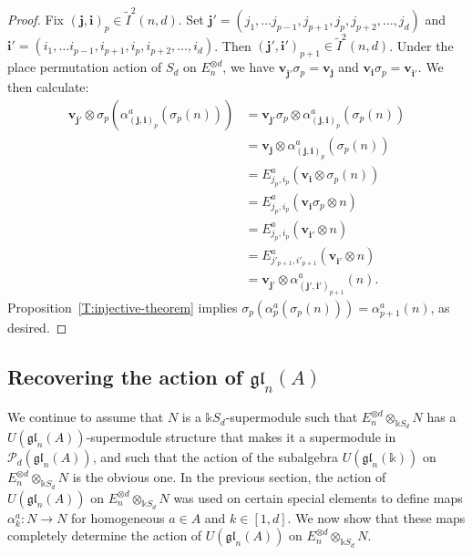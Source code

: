 \documentclass[11pt,reqno]{amsart} %
\newcommand{\gl}{\mathfrak{gl}}
\renewcommand{\k}{\mathds{k}}
\newcommand{\0}{\bar{0}}
\newcommand{\1}{\bar{1}}
\newcommand{\bv}{\mathbf{v}}
\newcommand{\bi}{\mathbf{i}}
\newcommand{\bj}{\mathbf{j}}
\newcommand{\Itwo}{\tilde{I}^{2}(n,d)}
\newcommand{\Pol}{\mathcal{P}}
\numberwithin{equation}{subsection}
\begin{document}
\begin{proof}
Fix $(\bj , \bi)_{p} \in \Itwo$. Set $\bj' = (j_{1}, \dotsc j_{p-1}, j_{p+1}, j_{p}, j_{p+2}, \dotsc , j_{d})$ and $\bi' = (i_{1}, \dotsc i_{p-1}, i_{p+1}, i_{p}, i_{p+2}, \dotsc , i_{d})$.  Then $(\bj', \bi')_{p+1} \in \Itwo$.  Under the place permutation action of $S_{d}$ on $E_{n}^{\otimes d}$, we have  $\bv^{}_{\bj'}\sigma_{p} = \bv^{}_{\bj}$ and  $\bv^{}_{\bi}\sigma_{p} = \bv^{}_{\bi'}$.  We then calculate:
\begin{align*}
\bv^{}_{\bj'} \otimes \sigma_{p}\left(\alpha_{(\bj,\bi)_{p}}^{a}(\sigma_{p}(n)) \right) &= \bv^{}_{\bj'}\sigma_{p} \otimes  \alpha_{(\bj,\bi)_{p}}^{a}(\sigma_{p}(n)) \\
&= \bv^{}_{\bj} \otimes  \alpha_{(\bj,\bi)_{p}}^{a}(\sigma_{p}(n)) \\
&= E^{a}_{j_{p}, i_{p}}(\bv^{}_{\bi} \otimes \sigma_{p}(n)) \\
&= E^{a}_{j_{p},i_{p}}(\bv^{}_{\bi}\sigma_{p}\otimes n)\\
&= E^{a}_{j_{p},i_{p}}(\bv^{}_{\bi'}\otimes n)\\
&= E^{a}_{j'_{p+1}, i'_{p+1}}(\bv^{}_{\bi'}\otimes n)\\
&=\bv^{}_{\bj'} \otimes \alpha^{a}_{(\bj' , \bi')_{p+1}}(n).
\end{align*} Proposition~\ref{T:injective-theorem} implies $\sigma_{p}(\alpha_{p}^{a}(\sigma_{p}(n))) =\alpha^{a}_{p+1}(n)$, as desired.
\end{proof}



\subsection{Recovering the action of $\gl_{n}(A)$}\label{SS:Recovering-the-glnA-action} 
We continue to assume that $N$ is a $\k S_{d}$-supermodule such that $E_{n}^{\otimes d} \otimes_{\k S_{d}} N$ has a $U(\gl_{n}(A))$-supermodule structure that makes it a supermodule in $\Pol_{d}(\gl_{n}(A))$, and such that the  action of the subalgebra $U(\gl_{n}(\k))$ on $E_{n}^{\otimes d} \otimes_{\k S_{d}} N$ is the obvious one.  In the previous section, the action of $U(\gl_{n}(A))$ on $E_{n}^{\otimes d} \otimes_{\k S_{d}} N$ was used on certain special elements to define maps  $\alpha^{a}_{k}:N \to N$ for homogeneous $a \in A$ and $k\in [1,d]$.  We now show that these maps completely determine the action of $U(\gl_{n}(A))$ on $E_{n}^{\otimes d} \otimes_{\k S_{d}} N$.
\end{document}
